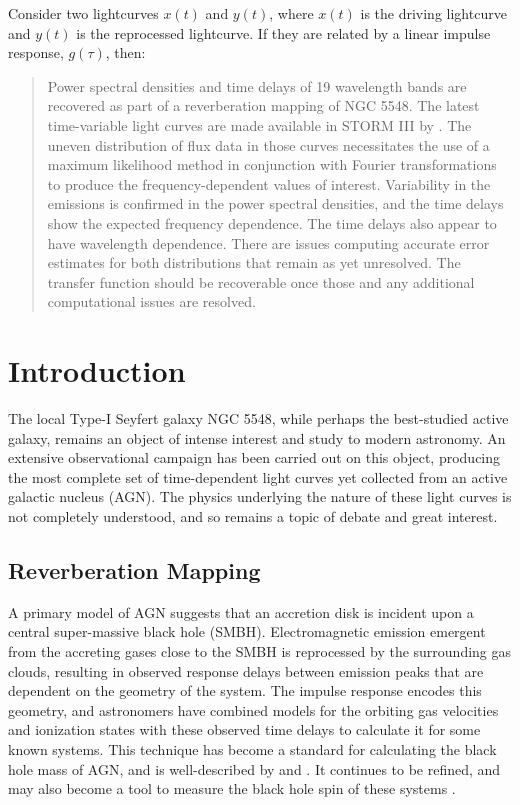 \documentclass[11pt,letterpaper]{article}
\begin{document}
Consider two lightcurves $x(t)$ and $y(t)$, where $x(t)$ is the driving lightcurve and $y(t)$ is the reprocessed lightcurve.  If they are related by a linear impulse response, $g(\tau)$, then: 


\begin{abstract}
Power spectral densities and time delays of 19 wavelength bands are recovered
as part of a reverberation mapping of NGC 5548. The latest time-variable light
curves are made available in STORM III by \cite{2016ApJ...821...56F}. The
uneven distribution of flux data in those curves necessitates the use of a
maximum likelihood method in conjunction with Fourier transformations to
produce the frequency-dependent values of interest. Variability in the
emissions is confirmed in the power spectral densities, and the time delays
show the expected frequency dependence. The time delays also appear to have
wavelength dependence. There are issues computing accurate error estimates for
both distributions that remain as yet unresolved. The transfer function should
be recoverable once those and any additional computational issues are
resolved.
\end{abstract}




\section{Introduction}
The local Type-I Seyfert galaxy NGC 5548, while perhaps the best-studied
active galaxy, remains an object of intense interest and study to modern
astronomy. An extensive observational campaign has been carried out on this
object, producing the most complete set of time-dependent light curves yet
collected from an active galactic nucleus (AGN). The physics underlying the
nature of these light curves is not completely understood, and so remains a
topic of debate and great interest.

	\subsection{Reverberation Mapping}
	A primary model of AGN suggests that an accretion disk is incident upon a
	central super-massive black hole (SMBH). Electromagnetic emission emergent
	from the accreting gases close to the SMBH is reprocessed by the
	surrounding gas clouds, resulting in observed response delays between
	emission peaks that are dependent on the geometry of the system. The
	impulse response encodes this geometry, and astronomers have combined
	models for the orbiting gas velocities and ionization states with these
	observed time delays to calculate it for some known systems. This
	technique has become a standard for calculating the black hole mass of
	AGN, and is well-described by \cite{2007MNRAS.380..669C} and
	\cite{2014A&ARv..22...72U}. It continues to be refined, and may also
	become a tool to measure the black hole spin of these systems
	\citep{2016arXiv160606736K}.
\end{document}
